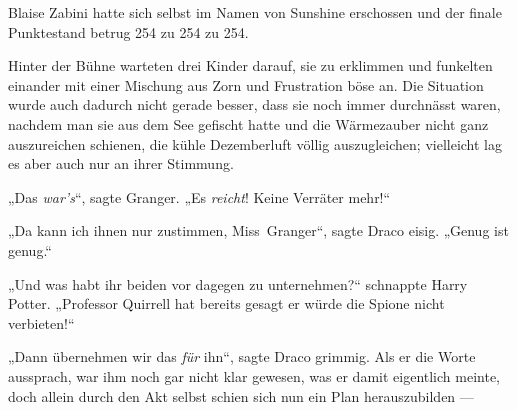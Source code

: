Blaise Zabini hatte sich selbst im Namen von Sunshine erschossen und der finale Punktestand betrug 254 zu 254 zu 254.

\later

Hinter der Bühne warteten drei Kinder darauf, sie zu erklimmen und funkelten einander mit einer Mischung aus Zorn und Frustration böse an. Die Situation wurde auch dadurch nicht gerade besser, dass sie noch immer durchnässt waren, nachdem man sie aus dem See gefischt hatte und die Wärmezauber nicht ganz auszureichen schienen, die kühle Dezemberluft völlig auszugleichen; vielleicht lag es aber auch nur an ihrer Stimmung.

„Das \emph{war’s}“, sagte Granger.
„Es \emph{reicht}! Keine Verräter mehr!“

„Da kann ich ihnen nur zustimmen, Miss~Granger“, sagte Draco eisig.
„Genug ist genug.“

„Und was habt ihr beiden vor dagegen zu unternehmen?“ schnappte Harry Potter.
„Professor Quirrell hat bereits gesagt er würde die Spione nicht verbieten!“

„Dann übernehmen wir das \emph{für} ihn“, sagte Draco grimmig. Als er die Worte aussprach, war ihm noch gar nicht klar gewesen, was er damit eigentlich meinte, doch allein durch den Akt selbst schien sich nun ein Plan herauszubilden —

\later

